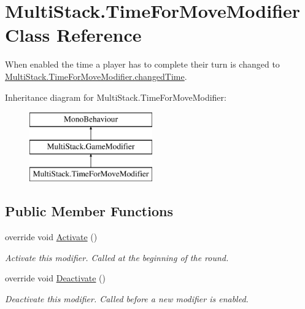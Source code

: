 \hypertarget{class_multi_stack_1_1_time_for_move_modifier}{}\section{Multi\+Stack.\+Time\+For\+Move\+Modifier Class Reference}
\label{class_multi_stack_1_1_time_for_move_modifier}


When enabled the time a player has to complete their turn is changed to \hyperlink{class_multi_stack_1_1_time_for_move_modifier_af70ee289af6f74c5ef18ef495fbc5c03}{Multi\+Stack.\+Time\+For\+Move\+Modifier.\+changed\+Time}.  


Inheritance diagram for Multi\+Stack.\+Time\+For\+Move\+Modifier\+:\begin{figure}[H]
\begin{center}
\leavevmode
\includegraphics[height=3.000000cm]{class_multi_stack_1_1_time_for_move_modifier}
\end{center}
\end{figure}
\subsection*{Public Member Functions}
\begin{DoxyCompactItemize}
\item 
override void \hyperlink{class_multi_stack_1_1_time_for_move_modifier_a20bbbf8a51e48116235eff90cfa841a3}{Activate} ()
\begin{DoxyCompactList}\small\item\em Activate this modifier. Called at the beginning of the round. \end{DoxyCompactList}\item 
override void \hyperlink{class_multi_stack_1_1_time_for_move_modifier_a52651c8cbe22e57c0e1d5dd3f4d5fafc}{Deactivate} ()
\begin{DoxyCompactList}\small\item\em Deactivate this modifier. Called before a new modifier is enabled. \end{DoxyCompactList}\end{DoxyCompactItemize}
